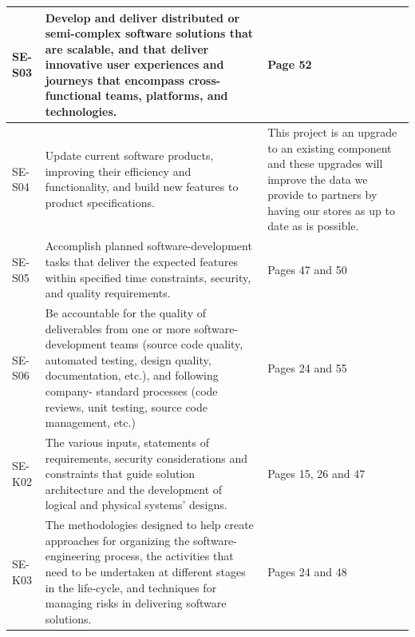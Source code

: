 \begin{longtable}{|p{2cm}|p{8cm}|p{4cm}|}
      SE-S03              & Develop and deliver distributed or semi-complex software solutions
                            that are scalable, and that deliver innovative user experiences and
                            journeys that encompass cross-functional teams, platforms, and technologies. & Page 52 \\ \hline

      SE-S04              & Update current software products, improving their efficiency and
                            functionality, and build new features to product specifications. 
                          
                          & This project is an upgrade to an existing component and these upgrades will improve the data we provide to partners 
                          by having our stores as up to date as is possible.  \\ \hline

      SE-S05              & Accomplish planned software-development tasks that deliver the expected
                            features within specified time constraints, security, and quality requirements. & Pages 47 and 50 \\ \hline

      SE-S06              & Be accountable for the quality of deliverables from one or more
                            software-development teams (source code quality, automated testing,
                            design quality, documentation, etc.), and following company-
                            standard processes (code reviews, unit testing, source code management, etc.)  & Pages 24 and 55 \\ \hline

      SE-K02              & The various inputs, statements of requirements, security considerations
                            and constraints that guide solution architecture and the development
                            of logical and physical systems' designs. & Pages 15, 26 and 47 \\ \hline

      SE-K03              & The methodologies designed to help create approaches for organizing
                            the software-engineering process, the activities that need to be
                            undertaken at different stages in the life-cycle, and techniques for
                            managing risks in delivering software solutions. & Pages 24 and 48 \\ \hline


\end{longtable}
